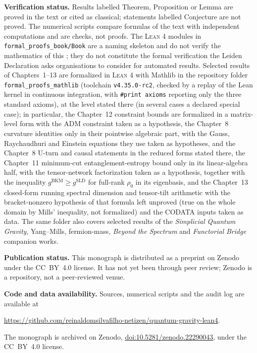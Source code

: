 \medskip\noindent\textbf{Verification status.} Results labelled Theorem, Proposition or Lemma are proved in the text or cited as classical; statements labelled Conjecture are not proved. The numerical scripts compare formulas of the text with independent computations and are checks, not proofs. The \textsc{Lean 4} modules in \texttt{formal\_proofs\_book/Book} are a naming skeleton and do not verify the mathematics of this \gtqgdeclscope; they do not constitute the formal verification the Leiden Declaration asks organisations to consider for automated results. Selected results of Chapters~1--13 are formalized in \textsc{Lean 4} with Mathlib in the repository folder \texttt{formal\_proofs\_mathlib} (toolchain \texttt{v4.35.0-rc2}, checked by a replay of the Lean kernel in continuous integration, with \texttt{\#print axioms} reporting only the three standard axioms), at the level stated there (in several cases a declared special case); in particular, the Chapter~12 constraint bounds are formalized in a matrix-level form with the ADM constraint taken as a hypothesis, the Chapter~8 curvature identities only in their pointwise algebraic part, with the Gauss, Raychaudhuri and Einstein equations they use taken as hypotheses, and the Chapter~8 U-turn and causal statements in the reduced forms stated there, the Chapter~11 minimum-cut entanglement-entropy bound only in its linear-algebra half, with the tensor-network factorization taken as a hypothesis, together with the inequality $g^{\mathrm{BKM}} \geq g^{\mathrm{SLD}}$ for full-rank $\rho_0$ in its eigenbasis, and the Chapter~13 closed-form running spectral dimension and tensor-tilt arithmetic with the bracket-nonzero hypothesis of that formula left unproved (true on the whole domain by Mills' inequality, not formalized) and the CODATA inputs taken as data. The same folder also covers selected results of the \textit{Simplicial Quantum Gravity}, Yang--Mills, fermion-mass, \textit{Beyond the Spectrum} and \textit{Functorial Bridge} companion works.

\medskip\noindent\textbf{Publication status.} This monograph is distributed as a preprint on Zenodo under the CC~BY~4.0 license. It has not yet been through peer review; Zenodo is a repository, not a peer-reviewed venue.

\medskip\noindent\textbf{Code and data availability.} Sources, numerical scripts and the audit log are available at
\begin{center}\url{https://github.com/reinaldomsilvafilho-netizen/quantum-gravity-lean4}.\end{center}
The monograph is archived on Zenodo, \href{https://doi.org/10.5281/zenodo.22290043}{doi:10.5281/zenodo.22290043}, under the CC~BY~4.0 license.
